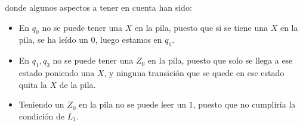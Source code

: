 \begin{ejercicio}
\begin{comment}
        &\delta(q_1,0,X) = \{(q_1,XX)\} \\
        &\delta(q_1,1,X) = \{(q_2,\veps)\} \\
        &\delta(q_1,2,X) = \{(q_0,X)\} \\
        &\delta(q_1,i,Z_0) = \emptyset \qquad i\in\{0,1,2\}\\
        &\delta(q_2,0,X) = \{(q_3,XX)\} \\
        &\delta(q_2,1,X) = \{(q_0,\veps)\} \\
        &\delta(q_2,2,X) = \{(q_0,X)\} \\
        &\delta(q_2,0,Z_0) = \{(q_3,XZ_0)\} \\
        &\delta(q_2,1,Z_0) = \emptyset \\
        &\delta(q_2,2,Z_0) = \{(q_0,Z_0)\} \\
        &\delta(q_3,0,X) = \{(q_1, XX)\} \\
        &\delta(q_3,1,X) = \{(q_2,\veps)\} \\
        &\delta(q_3,2,X) = \{(q_4,X)\} \\
        &\delta(q_3,i,Z_0) = \emptyset \qquad i\in\{0,1,2\}\\
        &\delta(q_4,0,X) = \{(q_4,XX)\} \\
        &\delta(q_4,1,X) = \{(q_4,\veps)\} \\
        &\delta(q_4,2,X) = \{(q_4,X)\} \\
        &\delta(q_4,0,Z_0) = \{(q_4,XZ_0)\} \\
        &\delta(q_4,1,Z_0) = \emptyset \\
        &\delta(q_4,2,Z_0) = \{(q_4,Z_0)\} \\
        &\red{\delta(q_4,\veps,Z_0) = \{(q_4,\veps)\}}
    \end{align*}
    \end{comment}
    donde algunos aspectos a tener en cuenta han sido:
    \begin{itemize}
        \item En $q_0$ no se puede tener una $X$ en la pila, puesto que si se tiene una $X$ en la pila, se ha leído un $0$, luego estamos en $q_1$.
        \item En $q_1,q_3$ no se puede tener una $Z_0$ en la pila, puesto que solo se llega a ese estado poniendo una $X$, y ninguna transición que se quede en ese estado quita la $X$ de la pila.
        \item Teniendo un $Z_0$ en la pila no se puede leer un $1$, puesto que no cumpliría la condición de $L_1$.
    \end{itemize}

\end{ejercicio}

